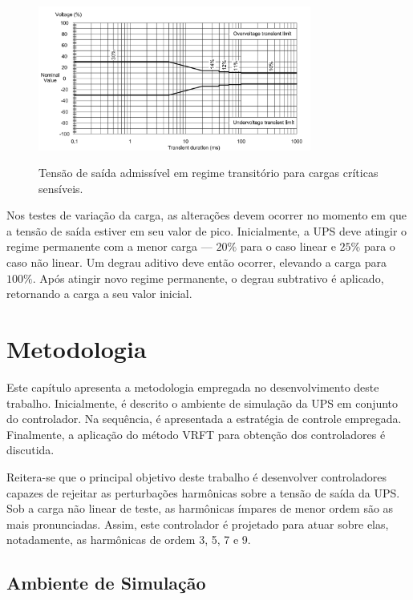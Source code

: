 \documentclass[repeatfields,oneside,overleaf]{tcc}
\begin{document}
\begin{figure}[h]
    \centering
    \caption{Tensão de saída admissível em regime transitório para cargas críticas sensíveis.}
    \includegraphics[trim={0 0 0 10}, clip, width=0.8\textwidth]{fig/DynamicVoltage1}
    \label{fig:IEC_DynamicVoltage1}
    \\
\end{figure}

Nos testes de variação da carga, as alterações devem ocorrer no momento em que a tensão de saída estiver em seu valor de pico.
Inicialmente, a UPS deve atingir o regime permanente com a menor carga --- $20 \%$ para o caso linear e $25 \%$ para o caso não linear.
Um degrau aditivo deve então ocorrer, elevando a carga para $100 \%$.
Após atingir novo regime permanente, o degrau subtrativo é aplicado, retornando a carga a seu valor inicial.


\chapter{Metodologia}\label{sec:metodologia}

Este capítulo apresenta a metodologia empregada no desenvolvimento deste trabalho.
Inicialmente, é descrito o ambiente de simulação da UPS em conjunto do controlador.
Na sequência, é apresentada a estratégia de controle empregada.
Finalmente, a aplicação do método VRFT para obtenção dos controladores é discutida.

Reitera-se que o principal objetivo deste trabalho é desenvolver controladores capazes de rejeitar as perturbações harmônicas sobre a tensão de saída da UPS.
Sob a carga não linear de teste, as harmônicas ímpares de menor ordem são as mais pronunciadas.
Assim, este controlador é projetado para atuar sobre elas, notadamente, as harmônicas de ordem 3, 5, 7 e 9.

\section{Ambiente de Simulação}
\end{document}
